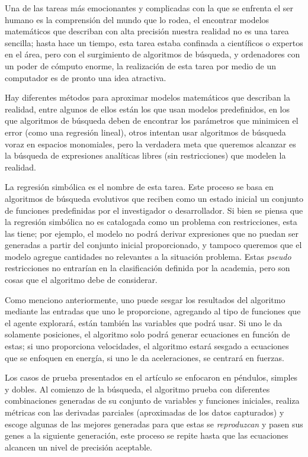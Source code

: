 \documentclass{article}
\begin{document}
        Una de las tareas más emocionantes y complicadas con la que se enfrenta el ser humano es la comprensión del mundo que lo rodea, el encontrar modelos matemáticos que describan con alta precisión nuestra realidad no es una tarea sencilla; hasta hace un tiempo, esta tarea estaba confinada a científicos o expertos en el área, pero con el surgimiento de algoritmos de búsqueda, y ordenadores con un poder de cómputo enorme, la realización de esta tarea por medio de un computador es de pronto una idea atractiva.

        Hay diferentes métodos para aproximar modelos matemáticos que describan la realidad, entre algunos de ellos están los que usan modelos predefinidos, en los que algoritmos de búsqueda deben de encontrar los parámetros que minimicen el error (como una regresión lineal), otros intentan usar algoritmos de búsqueda voraz en espacios monomiales, pero la verdadera meta que queremos alcanzar es la búsqueda de expresiones analíticas libres (sin restricciones) que modelen la realidad.

        La regresión simbólica es el nombre de esta tarea. Este proceso se basa en algoritmos de búsqueda evolutivos que reciben como un estado inicial un conjunto de funciones predefinidas por el investigador o desarrollador. Si bien se piensa que la regresión simbólica no es catalogada como un problema con restricciones, esta las tiene; por ejemplo, el modelo no podrá derivar expresiones que no puedan ser generadas a partir del conjunto inicial proporcionado, y tampoco queremos que el modelo agregue cantidades no relevantes a la situación problema. Estas \emph{pseudo} restricciones no entrarían en la clasificación definida por la academia, pero son cosas que el algoritmo debe de considerar.

        Como menciono anteriormente, uno puede sesgar los resultados del algoritmo mediante las entradas que uno le proporcione, agregando al tipo de funciones que el agente explorará, están también las variables que podrá usar. Si uno le da solamente posiciones, el algoritmo solo podrá generar ecuaciones en función de estas; si uno proporciona velocidades, el algoritmo estará sesgado a ecuaciones que se enfoquen en energía, si uno le da aceleraciones, se centrará en fuerzas.

        Los casos de prueba presentados en el artículo se enfocaron en péndulos, simples y dobles. Al comienzo de la búsqueda, el algoritmo prueba con diferentes combinaciones generadas de su conjunto de variables y funciones iniciales, realiza métricas con las derivadas parciales (aproximadas de los datos capturados) y escoge algunas de las mejores generadas para que estas se \emph{reproduzcan} y pasen sus genes a la siguiente generación, este proceso se repite hasta que las ecuaciones alcancen un nivel de precisión aceptable.
        
\end{document}
